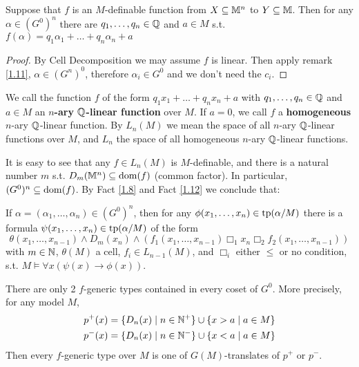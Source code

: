 \documentclass[11pt]{article}
\begin{document}
\begin{fact}[]
\label{1.12}
Suppose that \(f\) is an \(M\)-definable function from \(X\subseteq\mathbb{M}^n\) to \(Y\subseteq\mathbb{M}\). Then for
any \(\alpha\in(G^0)^n\) there are \(q_1,\dots,q_n\in\mathbb{Q}\) and \(a\in M\) s.t. \(f(\alpha)=q_1\alpha_1+\dots+q_n\alpha_n+a\)
\end{fact}

\begin{proof}
By Cell Decomposition we may assume \(f\) is linear. Then apply remark \ref{1.11},
\(\alpha\in(G^n)^0\), therefore \(\alpha_i\in G^0\) and we don't need the \(c_i\).
\end{proof}

\begin{definition}[]
We call the function \(f\) of the form \(q_1x_1+\dots+q_nx_n+a\) with \(q_1,\dots,q_n\in\mathbb{Q}\) and \(a\in M\) an
\textbf{\(n\)-ary \(\mathbb{Q}\)-linear function} over \(M\). If \(a=0\), we call \(f\) a
\textbf{homogeneous} \(n\)-ary \(\mathbb{Q}\)-linear function. By \(L_n(M)\) we mean the space of
all \(n\)-ary \(\mathbb{Q}\)-linear functions over \(M\), and \(L_n\) the space of all
homogeneous \(n\)-ary \(\mathbb{Q}\)-linear functions.
\end{definition}

It is easy to see that any \(f\in L_n(M)\) is \(M\)-definable, and there is a natural number \(m\)
s.t. \(D_m(\mathbb{M}^n)\subseteq\operatorname{dom}(f)\) (common factor). In particular, \((G^0)^n\subseteq\operatorname{dom}(f)\). By Fact \ref{1.8} and Fact \ref{1.12} we
conclude that:
\begin{corollary}[]
If \(\alpha=(\alpha_1,\dots,\alpha_n)\in(G^0)^n\), then for any \(\phi(x_1,\dots,x_n)\in\operatorname{tp}(\alpha/M)\) there is a
formula \(\psi(x_1,\dots,x_n)\in\operatorname{tp}(\alpha/M)\) of the form
\begin{equation*}
\theta(x_1,\dots,x_{n-1})\wedge D_m(x_n)\wedge(f_1(x_1,\dots,x_{n-1})\Box_1x_n\Box_2f_2(x_1,\dots,x_{n-1}))
\end{equation*}
with \(m\in\mathbb{N}\), \(\theta(M)\) a cell, \(f_i\in L_{n-1}(M)\), and \(\Box_i\) either \(\le\) or no condition,
s.t. \(M\vDash\forall x(\psi(x)\to\phi(x))\).
\end{corollary}

\begin{remark}
There are only 2 \(f\)-generic types contained in every coset of \(G^0\). More precisely, for any
model \(M\),
\begin{align*}
p^+(x)&=\{D_n(x)\mid n\in\mathbb{N}^+\}\cup\{x>a\mid a\in M\}\\
p^-(x)&=\{D_n(x)\mid n\in\mathbb{N}^-\}\cup\{x<a\mid a\in M\}
\end{align*}
Then every \(f\)-generic type over \(M\) is one of \(G(M)\)-translates of \(p^+\) or \(p^-\).
\end{remark}
\end{document}
